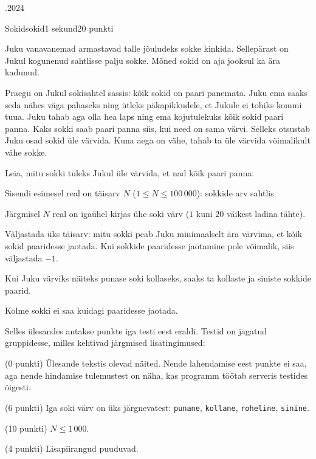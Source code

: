 \documentclass[a4paper,11pt]{article}
\begin{document}
\begin{ol}{\eio}{.2024}{\yle}{}
\begin{yl}{2}{Sokid}{sokid}{1 sekund}{20 punkti}

Juku vanavanemad armastavad talle jõuludeks sokke kinkida. Sellepärast on Jukul kogunenud sahtlisse palju sokke. Mõned sokid on aja jooksul ka ära kadunud.

Praegu on Jukul sokisahtel sassis: kõik sokid on paari panemata. Juku ema saaks seda nähes väga pahaseks ning ütleks päkapikkudele, et Jukule ei tohiks kommi tuua.
Juku tahab aga olla hea laps ning ema kojutulekuks kõik sokid paari panna.
Kaks sokki saab paari panna siis, kui need on sama värvi. Selleks otsustab Juku osad sokid üle värvida.
Kuna aega on vähe, tahab ta üle värvida võimalikult vähe sokke.

Leia, mitu sokki tuleks Jukul üle värvida, et nad kõik paari panna.

\sis
Sisendi esimesel real on täisarv $N$ ($1 \le N \le 100\,000$): sokkide arv sahtlis.

Järgmisel $N$ real on igaühel kirjas ühe soki värv ($1$ kuni $20$ väikest ladina tähte).

\val
Väljastada üks täisarv: mitu sokki peab Juku minimaalselt ära värvima, et kõik sokid paaridesse jaotada. Kui sokkide paaridesse jaotamine pole võimalik, siis väljastada $-1$.

\nde[0]{3cm}{3cm}

Kui Juku värviks näiteks punase soki kollaseks, saaks ta kollaste ja siniste sokkide paarid.

\nde[1]{3cm}{3cm}

Kolme sokki ei saa kuidagi paaridesse jaotada.

\hnd
Selles ülesandes antakse punkte iga testi eest eraldi. Testid on jagatud gruppidesse, milles kehtivad järgmised lisatingimused:
\begin{xenum}
	\item (0 punkti) Ülesande tekstis olevad näited. Nende lahendamise eest punkte ei saa, aga nende hindamise tulemustest on näha, kas programm töötab serveris testides õigesti.
	\item (6 punkti) Iga soki värv on üks järgnevatest: \verb/punane/, \verb/kollane/, \verb/roheline/, \verb/sinine/.
	\item (10 punkti) $N \le 1\,000$.
	\item (4 punkti) Lisapiirangud puuduvad.
\end{xenum}

\end{yl}
\end{ol}
\end{document}
